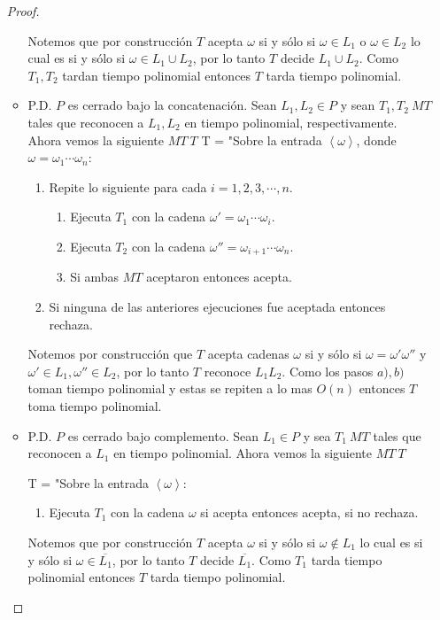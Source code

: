 \documentclass[letterpaper]{article}
\theoremstyle{definition}
\theoremstyle{lemathm}
\theoremstyle{lemathm}
\theoremstyle{lemathm}
\theoremstyle{lemademthm}
\newcommand{\txto}{\text{ o }}
\newcommand{\pars}[1]{\left( #1 \right) }
\newcommand{\inprod}[1]{\left\langle #1 \right\rangle }
\newcommand{\1}{\mathbbm{1}}
\begin{document}
\begin{enumerate}
\begin{proof}
\begin{itemize}
					Notemos que por construcción $T$ acepta $\omega$ si y sólo si $\omega \in L_1 \txto \omega\in L_2$ lo cual es si y sólo si $\omega\in L_1\cup L_2$, por lo tanto $T$ decide $L_1\cup L_2$. Como $T_1,T_2$ tardan tiempo polinomial entonces $T$ tarda tiempo polinomial.
					\item P.D. $P$ es cerrado bajo la concatenación. Sean $L_1,L_2\in P$ y sean $T_1,T_2 \ MT$ tales que reconocen a $L_1,L_2$ en tiempo polinomial, respectivamente. Ahora vemos la siguiente $MT \ T$
					T = "Sobre la entrada $\inprod{\omega}$, donde $\omega = \omega_1\cdots\omega_n$:
					\begin{enumerate}
						\item Repite lo siguiente para cada $i = 1,2,3,\cdots,n$.
						\begin{enumerate}
							\item Ejecuta $T_1$ con la cadena $\omega' = \omega_1\cdots\omega_i$.
							\item Ejecuta $T_2$ con la cadena $\omega'' = \omega_{i+1}\cdots\omega_n$.
							\item Si ambas $MT$ aceptaron entonces acepta.
						\end{enumerate}
						\item Si ninguna de las anteriores ejecuciones fue aceptada entonces rechaza.
					\end{enumerate}
					Notemos por construcción que $T$ acepta cadenas $\omega$ si y sólo si $\omega = \omega'\omega''$ y $\omega'\in L_1, \omega''\in L_2$, por lo tanto $T$ reconoce $L_1L_2$. Como los pasos $a),b)$ toman tiempo polinomial y estas se repiten a lo mas $O\pars{n}$ entonces $T$ toma tiempo polinomial.
					\item P.D. $P$ es cerrado bajo complemento. Sean $L_1\in P$ y sea $T_1 \ MT$ tales que reconocen a $L_1$ en tiempo polinomial. Ahora vemos la siguiente $MT \ T$
					
					T = "Sobre la entrada $\inprod{\omega}$:
					\begin{enumerate}
						\item Ejecuta $T_1$ con la cadena $\omega$ si acepta entonces acepta, si no rechaza.
					\end{enumerate}

					Notemos que por construcción $T$ acepta $\omega$ si y sólo si $\omega \not\in L_1$ lo cual es si y sólo si $\omega\in \overline{L_1}$, por lo tanto $T$ decide $\overline{L_1}$. Como $T_1$ tarda tiempo polinomial entonces $T$ tarda tiempo polinomial.
				\end{itemize}
			\end{proof}


\end{enumerate}
\end{document}
